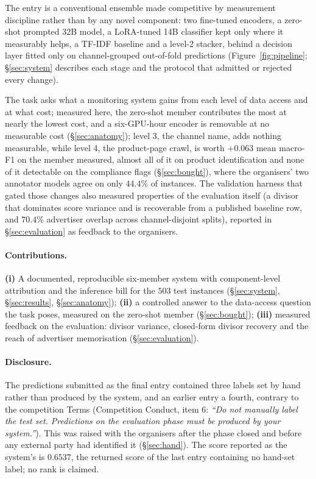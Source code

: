 \documentclass[11pt]{article}
\begin{document}
The entry is a conventional ensemble made competitive by measurement discipline rather than by
any novel component: two fine-tuned encoders, a zero-shot prompted 32B model, a LoRA-tuned 14B
classifier kept only where it measurably helps, a TF-IDF baseline and a level-2 stacker, behind
a decision layer fitted only on channel-grouped out-of-fold predictions (Figure~\ref{fig:pipeline};
\S\ref{sec:system} describes each stage and the protocol that admitted or rejected every change).

The task asks what a monitoring system gains from each level of data access and at what cost;
measured here, the zero-shot member contributes the most at nearly the lowest cost, and a
six-GPU-hour encoder is removable at no measurable cost (\S\ref{sec:anatomy}); level 3, the
channel name, adds nothing measurable, while level 4, the product-page crawl, is worth $+0.063$
mean macro-F1 on the member measured, almost all of it on product identification and none of it
detectable on the compliance flags (\S\ref{sec:bought}), where the organisers' two annotator
models agree on only $44.4\%$ of instances. The validation harness that gated those changes
also measured properties of the evaluation itself (a divisor that dominates score variance and
is recoverable from a published baseline row, and $70.4\%$ advertiser overlap across
channel-disjoint splits), reported in \S\ref{sec:evaluation} as feedback to the organisers.

\paragraph{Contributions.}
\textbf{(i)} A documented, reproducible six-member system with component-level attribution and
the inference bill for the $503$ test instances (\S\ref{sec:system}, \S\ref{sec:results},
\S\ref{sec:anatomy}); \textbf{(ii)} a controlled answer to the data-access question the task
poses, measured on the zero-shot member (\S\ref{sec:bought}); \textbf{(iii)} measured feedback
on the evaluation: divisor variance, closed-form divisor recovery and the reach of advertiser
memorisation (\S\ref{sec:evaluation}).

\paragraph{Disclosure.}
The predictions submitted as the final entry contained three labels set by hand rather than
produced by the system, and an earlier entry a fourth, contrary to the competition Terms
(Competition Conduct, item 6: \emph{``Do not manually label the test set. Predictions on the
evaluation phase must be produced by your system.''}). This was raised with the organisers
after the phase closed and before any external party had identified it (\S\ref{sec:hand}). The
score reported as the system's is $0.6537$, the returned score of the last entry containing no
hand-set label; no rank is claimed.
\end{document}
